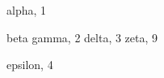 \documentclass{article}
\begin{document}
\begin{theindex}
\item alpha, 1
\item beta
  \subitem gamma, 2
  \subitem delta, 3
    \subsubitem zeta, 9
\item epsilon, 4
\end{theindex}
\end{document}
